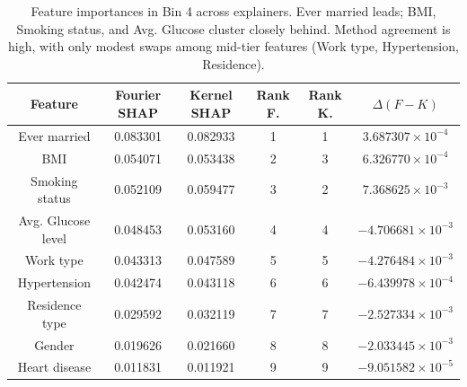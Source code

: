 \documentclass[letterpaper,11pt]{article}
\numberwithin{equation}{section}
\numberwithin{equation}{section}
\begin{document}
\begin{table}[H]
    \centering
    \begin{tabular}{|c||c|c|c|c|c|} \hline 
         Feature & Fourier SHAP & Kernel SHAP & Rank F. & Rank K. & $\Delta (F-K) $ \\ \hline \hline 
         Ever married &	0.083301 & 0.082933 & 1 & 1 & $3.687307\times 10^{-4}$\\ \hline 
        BMI & 0.054071 & 0.053438 &	2 &	3 &	$6.326770 \times 10^{-4}$ \\ \hline
        Smoking status & 0.052109 &	0.059477 & 3 & 2 & $7.368625\times 10^{-3}$ \\ \hline 
        Avg. Glucose level & 0.048453 &	0.053160 & 4 & 4 & $-4.706681 \times 10^{-3}$ \\ \hline 
        Work type &	0.043313 & 0.047589 & 5 & 5 & $-4.276484 \times 10^{-3}$ \\ \hline 
        Hypertension & 0.042474 & 0.043118 & 6 & 6 & $-6.439978\times 10^{-4}$\\ \hline 
        Residence type & 0.029592 &	0.032119 & 7 & 7 & $-2.527334\times 10^{-3}$\\ \hline 
        Gender &  0.019626 & 0.021660 &	8 &	8 &	$-2.033445\times 10^{-3}$\\ \hline 
        Heart disease &	0.011831 & 0.011921 & 9 & 9 & $-9.051582\times 10^{-5}$\\ \hline
    \end{tabular}
    \caption{Feature importances in Bin 4 across explainers. Ever married leads; BMI, Smoking status, and Avg. Glucose cluster closely behind. Method agreement is high, with only modest swaps among mid-tier features (Work type, Hypertension, Residence).}
\end{table}
\end{document}
